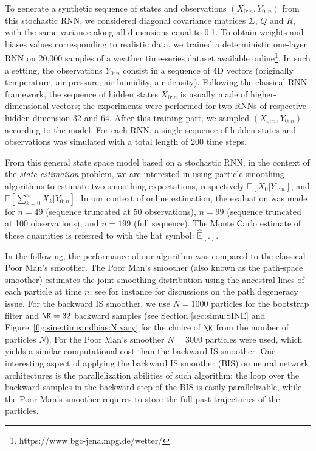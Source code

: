 \documentclass[12pt]{article}
\begin{document}
To generate a synthetic sequence of states and observations $(X_{0:n},Y_{0:n})$ from this stochastic RNN, we considered diagonal covariance matrices $\Sigma$, $Q$ and $R$, with the same variance along all dimensions equal to 0.1. 
 To obtain weights and biases values corresponding to realistic data, we  trained a deterministic one-layer RNN on 20,000 samples of a weather time-series dataset available online\footnote{https://www.bgc-jena.mpg.de/wetter/}. 
In such a setting, the observations $Y_{0:n}$ consist in a sequence of 4D vectors (originally temperature, air pressure, air humidity, air density).
Following the classical RNN framework,  the sequence of hidden states $X_{0:n}$ is usually made of higher-dimensional vectors; the experiments were performed for two RNNs of respective hidden dimension 32 and 64. 
After this training part, we sampled $(X_{0:n}, Y_{0:n})$ according to the model. 
For each RNN,  a single sequence of  hidden states and observations was simulated with a total length of 200 time steps.
 
 From this general state space model based on a stochastic RNN, in the context of the \textit{state estimation} problem, we are interested in using particle smoothing algorithms to estimate two smoothing expectations, respectively $\mathbb{E}[X_0|Y_{0:n}]$, and $\mathbb{E}[\sum_{k=0}^{n} X_k|Y_{0:n}]$. 
 In our context of online estimation, the evaluation was made for $n=49$ (sequence truncated at 50 observations), $n=99$ (sequence truncated at 100 observations), and $n=199$ (full sequence). 
  The Monte Carlo  estimate of these quantities is referred to with the hat symbol: $\mathbb{\widehat{E}}[.]$. 

In the following, the performance of our algorithm was compared to the classical Poor Man's smoother. 
The  Poor Man's smoother (also known as the path-space smoother) estimates the joint smoothing distribution using the ancestral lines of each particle at time $n$; see for instance \cite{douc2014nonlinear} for discussions on the path degeneracy issue.
For the backward IS smoother, we use $N=1000$ particles for the bootstrap filter and $\K=32$ backward samples (see Section \ref{sec:simu:SINE} and Figure~\ref{fig:sine:timeandbias:N:vary} for the choice of $\K$ from the number of particles $N$). 
For the Poor Man's smoother $N=3000$ particles were used, which yields a similar computational cost than the backward IS smoother. 
One interesting aspect of applying the backward IS smoother (BIS) on neural network architectures is the parallelization abilities of such algorithm: the loop over the backward samples in the backward step of the BIS is easily parallelizable, while the Poor Man's smoother requires to store the full past trajectories of the particles. 
\end{document}
